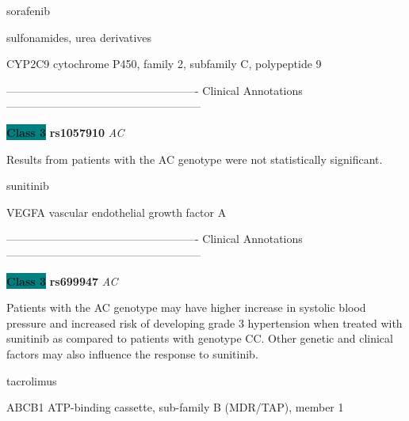 \documentclass{resume} %
\begin{document}
\begin{rSection}{ sorafenib }
\end{rSection}\begin{rSection}{ sulfonamides, urea derivatives }
\item[]

\begin{rSubsection}{ CYP2C9 }{ cytochrome P450, family 2, subfamily C, polypeptide 9 }{}{}
\item[]

\item[] ---------------------------------------------------- Clinical Annotations -----------------------------------------------------\newline
\item \textbf{\colorbox{teal} {Class 3}} \textbf{ rs1057910 } \textit{ AC }
\item[] Results from patients with the AC genotype were not statistically significant.
\end{rSubsection}

\end{rSection}\begin{rSection}{ sunitinib }
\item[]

\begin{rSubsection}{ VEGFA }{ vascular endothelial growth factor A }{}{}
\item[]

\item[] ---------------------------------------------------- Clinical Annotations -----------------------------------------------------\newline
\item \textbf{\colorbox{teal} {Class 3}} \textbf{ rs699947 } \textit{ AC }
\item[] Patients with the AC genotype may have higher increase in systolic blood pressure and increased risk of developing grade 3 hypertension when treated with sunitinib as compared to patients with genotype CC. Other genetic and clinical factors may also influence the response to sunitinib.
\end{rSubsection}

\end{rSection}\begin{rSection}{ tacrolimus }
\item[]

\begin{rSubsection}{ ABCB1 }{ ATP-binding cassette, sub-family B (MDR/TAP), member 1 }{}{}
\item[]


\end{rSubsection}
\end{rSection}
\end{document}
